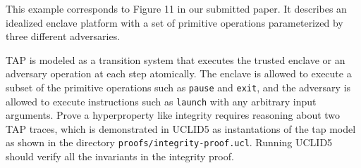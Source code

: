 This example corresponds to Figure 11 in our submitted paper. It describes an idealized enclave platform with a set of primitive operations parameterized by three different adversaries.

TAP is modeled as a transition system that executes the trusted enclave or an adversary operation at each step atomically. The enclave is allowed to execute a subset of the primitive operations such as \texttt{pause} and \texttt{exit}, and the adversary is allowed to execute instructions such as \texttt{launch} with any arbitrary input arguments. Prove a hyperproperty like integrity requires reasoning about two TAP traces, which is demonstrated in UCLID5 as instantations of the tap model as shown in the directory \texttt{proofs/integrity-proof.ucl}. Running UCLID5 should verify all the invariants in the integrity proof. 
